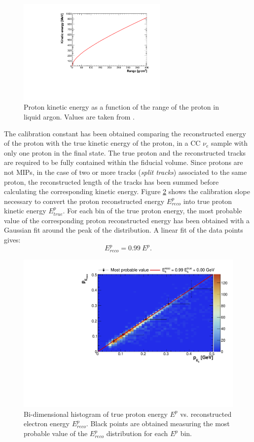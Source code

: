 \begin{figure}[htbp]
\centering
\includegraphics[width=0.65\textwidth]{figures/proton.pdf}
\caption{Proton kinetic energy as a function of the range of the proton in liquid argon. Values are taken from \cite{pstar}.} 
\label{fig:proton}
\end{figure}

The calibration constant has been obtained comparing the reconstructed energy of the proton with the true kinetic energy of the proton, in a CC $\nu_{e}$ sample with only one proton in the final state. The true proton and the reconstructed tracks are required to be fully contained within the fiducial volume. Since protons are not MIPs, in the case of two or more tracks (\emph{split tracks}) associated to the same proton, the reconstructed length of the tracks has been summed before calculating the corresponding kinetic energy.
Figure \ref{fig:pcalib} shows the calibration slope necessary to convert the proton reconstructed energy $E_{reco}^{p}$ into true proton kinetic energy $E_{true}^{p}$. For each bin of the true proton energy, the most probable value of the corresponding proton reconstructed energy has been obtained with a Gaussian fit around the peak of the distribution. A linear fit of the data points gives:
\begin{equation}
E_{reco}^{p} = 0.99~E^{p}.
\end{equation}

\begin{figure}[!htbp]
\centering
\includegraphics[width=0.65\columnwidth]{figures/pcalib.pdf}
\caption{Bi-dimensional histogram of true proton energy $E^{p}$ vs. reconstructed electron energy $E_{reco}^{p}$. Black points are obtained measuring the most probable value of the $E_{reco}^{p}$ distribution for each $E^{p}$ bin.}
\label{fig:pcalib}
\end{figure}



